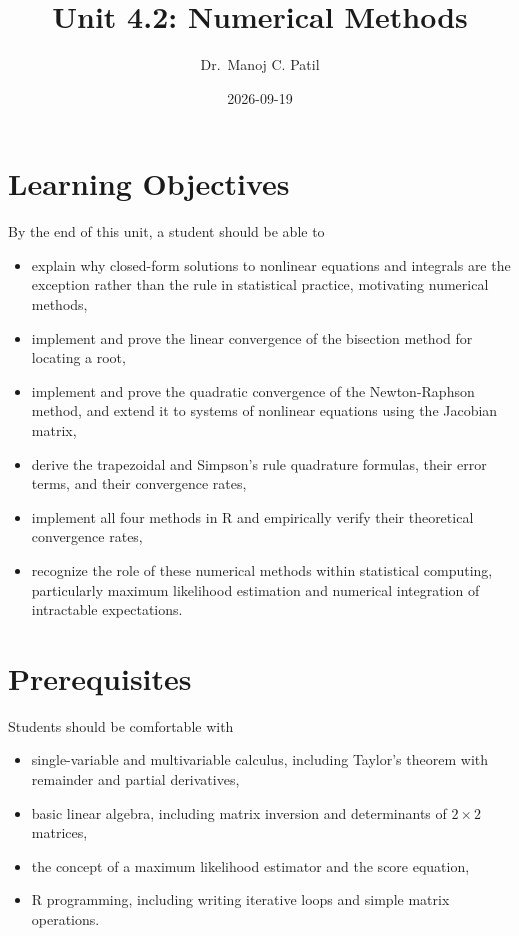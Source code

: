 \documentclass[
]{article}
\title{Unit 4.2: Numerical Methods}
\author{Dr.~Manoj C. Patil}
\date{2026-09-19}
\providecommand{\tightlist}{%
  \setlength{\itemsep}{0pt}\setlength{\parskip}{0pt}}
\begin{document}
\maketitle

\section{Learning Objectives}\label{learning-objectives}

By the end of this unit, a student should be able to

\begin{itemize}
\tightlist
\item
  explain why closed-form solutions to nonlinear equations and integrals
  are the exception rather than the rule in statistical practice,
  motivating numerical methods,
\item
  implement and prove the linear convergence of the bisection method for
  locating a root,
\item
  implement and prove the quadratic convergence of the Newton-Raphson
  method, and extend it to systems of nonlinear equations using the
  Jacobian matrix,
\item
  derive the trapezoidal and Simpson's rule quadrature formulas, their
  error terms, and their convergence rates,
\item
  implement all four methods in R and empirically verify their
  theoretical convergence rates,
\item
  recognize the role of these numerical methods within statistical
  computing, particularly maximum likelihood estimation and numerical
  integration of intractable expectations.
\end{itemize}

\section{Prerequisites}\label{prerequisites}

Students should be comfortable with

\begin{itemize}
\tightlist
\item
  single-variable and multivariable calculus, including Taylor's theorem
  with remainder and partial derivatives,
\item
  basic linear algebra, including matrix inversion and determinants of
  \(2\times2\) matrices,
\item
  the concept of a maximum likelihood estimator and the score equation,
\item
  R programming, including writing iterative loops and simple matrix
  operations.
\end{itemize}
\end{document}
